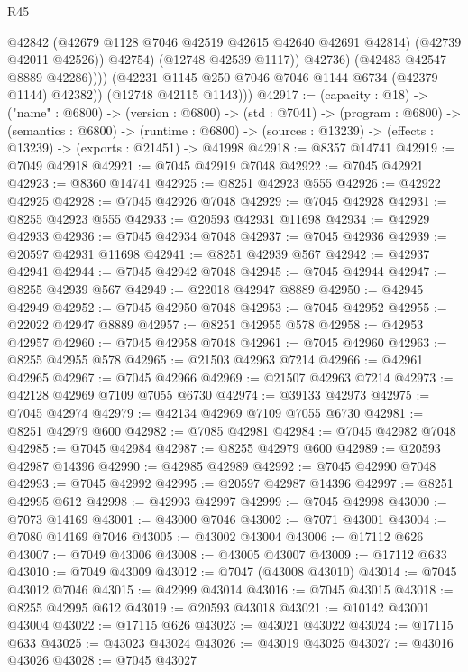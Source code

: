\begin{lexlean}{R45}
\begin{coremodule}
{                        @42842
                        (@42679 @1128 @7046 @42519 @42615 @42640 @42691 @42814)
                        (@42739 @42011 @42526))
                      @42754)
                    (@12748 @42539 @1117))
                  @42736)
                (@42483 @42547 @8889 @42286))))
          (@42231 @1145 @250 @7046 @7046 @1144 @6734 (@42379 @1144) @42382))
        (@12748 @42115 @1143)))
@42917 := (capacity : @18) ->
  ("name" : @6800) ->
  (version : @6800) ->
  (std : @7041) ->
  (program : @6800) ->
  (semantics : @6800) ->
  (runtime : @6800) -> (sources : @13239) -> (effects : @13239) -> (exports : @21451) -> @41998
@42918 := @8357 @14741
@42919 := @7049 @42918
@42921 := @7045 @42919 @7048
@42922 := @7045 @42921
@42923 := @8360 @14741
@42925 := @8251 @42923 @555
@42926 := @42922 @42925
@42928 := @7045 @42926 @7048
@42929 := @7045 @42928
@42931 := @8255 @42923 @555
@42933 := @20593 @42931 @11698
@42934 := @42929 @42933
@42936 := @7045 @42934 @7048
@42937 := @7045 @42936
@42939 := @20597 @42931 @11698
@42941 := @8251 @42939 @567
@42942 := @42937 @42941
@42944 := @7045 @42942 @7048
@42945 := @7045 @42944
@42947 := @8255 @42939 @567
@42949 := @22018 @42947 @8889
@42950 := @42945 @42949
@42952 := @7045 @42950 @7048
@42953 := @7045 @42952
@42955 := @22022 @42947 @8889
@42957 := @8251 @42955 @578
@42958 := @42953 @42957
@42960 := @7045 @42958 @7048
@42961 := @7045 @42960
@42963 := @8255 @42955 @578
@42965 := @21503 @42963 @7214
@42966 := @42961 @42965
@42967 := @7045 @42966
@42969 := @21507 @42963 @7214
@42973 := @42128 @42969 @7109 @7055 @6730
@42974 := @39133 @42973
@42975 := @7045 @42974
@42979 := @42134 @42969 @7109 @7055 @6730
@42981 := @8251 @42979 @600
@42982 := @7085 @42981
@42984 := @7045 @42982 @7048
@42985 := @7045 @42984
@42987 := @8255 @42979 @600
@42989 := @20593 @42987 @14396
@42990 := @42985 @42989
@42992 := @7045 @42990 @7048
@42993 := @7045 @42992
@42995 := @20597 @42987 @14396
@42997 := @8251 @42995 @612
@42998 := @42993 @42997
@42999 := @7045 @42998
@43000 := @7073 @14169
@43001 := @43000 @7046
@43002 := @7071 @43001
@43004 := @7080 @14169 @7046
@43005 := @43002 @43004
@43006 := @17112 @626
@43007 := @7049 @43006
@43008 := @43005 @43007
@43009 := @17112 @633
@43010 := @7049 @43009
@43012 := @7047 (@43008 @43010)
@43014 := @7045 @43012 @7046
@43015 := @42999 @43014
@43016 := @7045 @43015
@43018 := @8255 @42995 @612
@43019 := @20593 @43018
@43021 := @10142 @43001 @43004
@43022 := @17115 @626
@43023 := @43021 @43022
@43024 := @17115 @633
@43025 := @43023 @43024
@43026 := @43019 @43025
@43027 := @43016 @43026
@43028 := @7045 @43027
}
\end{coremodule}
\end{lexlean}
